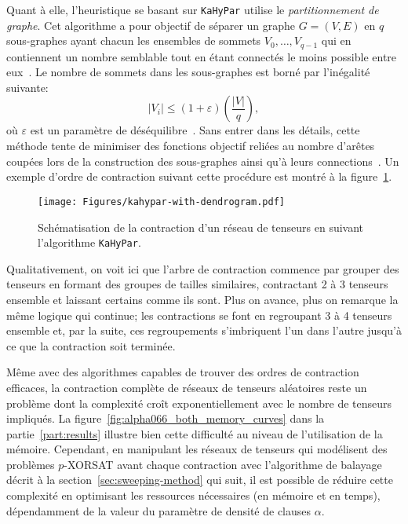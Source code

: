 Quant à elle, l'heuristique se basant sur \verb|KaHyPar| utilise le \textit{partitionnement de graphe}.
Cet algorithme a pour objectif de séparer un graphe $G = (V, E)$ en $q$ sous-graphes ayant chacun les ensembles de sommets $V_0, \dots, V_{q-1}$ qui en contiennent un nombre semblable tout en étant connectés le moins possible entre eux~\cite{paper-kahypar}.
Le nombre de sommets dans les sous-graphes est borné par l'inégalité suivante:
\begin{equation}
    |V_i| \leq (1 + \varepsilon)\left(\frac{|V|}{q}\right),
\end{equation}
où $\varepsilon$ est un paramètre de déséquilibre~\cite{paper-kahypar}.
Sans entrer dans les détails, cette méthode tente de minimiser des fonctions objectif reliées au nombre d'arêtes coupées lors de la construction des sous-graphes ainsi qu'à leurs connections~\cite{PhDThesis-kahypar}.
Un exemple d'ordre de contraction suivant cette procédure est montré à la figure~\ref{fig:kahypar-with-dendrogram}.
\begin{figure}[h]
    \centering
    \texttt{[image: Figures/kahypar-with-dendrogram.pdf]}
    \caption[Schématisation de la contraction d'un réseau de tenseurs (\texttt{KaHyPar}).]{Schématisation de la contraction d'un réseau de tenseurs en suivant l'algorithme \texttt{KaHyPar}.}
    \label{fig:kahypar-with-dendrogram}
\end{figure}
Qualitativement, on voit ici que l'arbre de contraction commence par grouper des tenseurs en formant des groupes de tailles similaires, contractant 2 à 3 tenseurs ensemble et laissant certains comme ils sont.
Plus on avance, plus on remarque la même logique qui continue; les contractions se font en regroupant 3 à 4 tenseurs ensemble et, par la suite, ces regroupements s'imbriquent l'un dans l'autre jusqu'à ce que la contraction soit terminée.

Même avec des algorithmes capables de trouver des ordres de contraction efficaces, la contraction complète de réseaux de tenseurs aléatoires reste un problème dont la complexité croît exponentiellement avec le nombre de tenseurs impliqués.
La figure~\ref{fig:alpha066_both_memory_curves} dans la partie~\ref{part:results} illustre bien cette difficulté au niveau de l'utilisation de la mémoire.
Cependant, en manipulant les réseaux de tenseurs qui modélisent des problèmes $p$-XORSAT avant chaque contraction avec l'algorithme de balayage décrit à la section~\ref{sec:sweeping-method} qui suit, il est possible de réduire cette complexité en optimisant les ressources nécessaires (en mémoire et en temps), dépendamment de la valeur du paramètre de densité de clauses $\alpha$.


